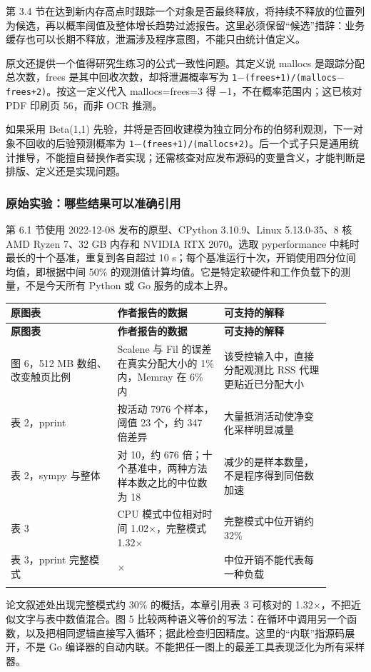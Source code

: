 \documentclass[UTF8,fontset=fandol,openany,11pt]{ctexbook}
\begin{document}
第 3.4 节在达到新内存高点时跟踪一个对象是否最终释放，将持续不释放的位置列为候选，再以概率阈值及整体增长趋势过滤报告。这里必须保留“候选”措辞：业务缓存也可以长期不释放，泄漏涉及程序意图，不能只由统计值定义。

原文还提供一个值得研究生练习的公式一致性问题。其定义说 mallocs 是跟踪分配总次数，frees 是其中回收次数，却将泄漏概率写为 \texttt{1\ensuremath{-}(frees+1)/\allowbreak{}(mallocs\ensuremath{-}frees+2)}。按这一定义代入 mallocs=frees=3 得 \ensuremath{-}1，不在概率范围内；这已核对 PDF 印刷页 56，而非 OCR 推测。

如果采用 Beta(1,1) 先验，并将是否回收建模为独立同分布的伯努利观测，下一对象不回收的后验预测概率为 \texttt{1\ensuremath{-}(frees+1)/\allowbreak{}(mallocs+2)}。后一个式子只是通用统计推导，不能擅自替换作者实现；还需核查对应发布源码的变量含义，才能判断是排版、定义还是实现问题。

\subsubsection{原始实验：哪些结果可以准确引用}
第 6.1 节使用 2022-12-08 发布的原型、CPython 3.10.9、Linux 5.13.0-35、8 核 AMD Ryzen 7、32 GB 内存和 NVIDIA RTX 2070。选取 pyperformance 中耗时最长的十个基准，重复到各自超过 10 s；每个基准运行十次，开销使用四分位间均值，即根据中间 50\% 的观测值计算均值。它是特定软硬件和工作负载下的测量，不是今天所有 Python 或 Go 服务的成本上界。

\begingroup\small\setlength{\tabcolsep}{4pt}
\begin{longtable}{>{\raggedright\arraybackslash}p{0.298\linewidth}>{\raggedright\arraybackslash}p{0.298\linewidth}>{\raggedright\arraybackslash}p{0.298\linewidth}}
\toprule
\textbf{原图表} & \textbf{作者报告的数据} & \textbf{可支持的解释} \\
\midrule
\endfirsthead
\toprule
\textbf{原图表} & \textbf{作者报告的数据} & \textbf{可支持的解释} \\
\midrule
\endhead
图 6，512 MB 数组、改变触页比例 & Scalene 与 Fil 的误差在真实分配大小的 1\% 内，Memray 在 6\% 内 & 该受控输入中，直接分配观测比 RSS 代理更贴近已分配大小 \\
\addlinespace[3pt]
表 2，pprint & 按活动 7976 个样本，阈值 23 个，约 347 倍差异 & 大量抵消活动使净变化采样明显减量 \\
\addlinespace[3pt]
表 2，sympy 与整体 & 6757 对 10，约 676 倍；十个基准中，两种方法样本数之比的中位数为 18 & 减少的是样本数量，不是程序得到同倍数加速 \\
\addlinespace[3pt]
表 3 & CPU 模式中位相对时间 1.02\ensuremath{\times}，完整模式 1.32\ensuremath{\times} & 完整模式中位开销约 32\% \\
\addlinespace[3pt]
表 3，pprint 完整模式 & 4.03\ensuremath{\times} & 中位开销不能代表每一种负载 \\
\addlinespace[3pt]
\bottomrule
\end{longtable}
\endgroup
论文叙述处出现完整模式约 30\% 的概括，本章引用表 3 可核对的 1.32\ensuremath{\times}，不把近似文字与表中数值混合。图 5 比较两种语义等价的写法：在循环中调用另一个函数，以及把相同逻辑直接写入循环；据此检查归因精度。这里的“内联”指源码展开，不是 Go 编译器的自动内联。不能把任一图上的最差工具表现泛化为所有采样器。\cite{paper-scalene}
\end{document}
